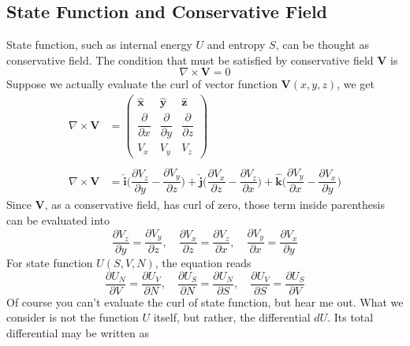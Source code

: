 \documentclass[../../../main.tex]{subfiles}
\begin{document}
\subsection{State Function and Conservative Field}
State function, such as internal energy \(U \) and entropy \(S \), can be thought as conservative field. The condition that must be satisfied by conservative field $\mathbf{V}$ is
\begin{equation*}
    \nabla\times \mathbf{V}=0
\end{equation*}
Suppose we actually evaluate the curl of vector function $\mathbf{V}(x,y,z)$, we get
\begin{align*}
    \nabla\times \mathbf{V}&=\begin{pmatrix}
        \mathbf{\hat{x}} & \mathbf{\hat{y}} & \mathbf{\hat{z}}\\
        \dfrac{\partial }{\partial x} & \dfrac{\partial }{\partial y} & \dfrac{\partial }{\partial z}\\
        V_x& V_y & V_z
    \end{pmatrix}\\
    \\
    \nabla\times \mathbf{V}&=
    \mathbf{\hat{i}} \biggl(\dfrac{\partial V_z}{\partial y} -\dfrac{\partial V_y}{\partial z}\biggr)+ 
    \mathbf{\hat{j}} \biggl(\dfrac{\partial V_x}{\partial z}-\dfrac{\partial V_z}{\partial x} \biggr) + 
    \mathbf{\hat{k}}\biggl( \dfrac{\partial V_y}{\partial x}-\dfrac{\partial V_x}{\partial y}\biggr)
\end{align*} 
Since \textbf{V}, as a conservative field, has curl of zero, those term inside parenthesis can be evaluated into
\begin{equation*}
    \dfrac{\partial V_z}{\partial y} =\dfrac{\partial V_y}{\partial z},\quad
    \dfrac{\partial V_x}{\partial z}=\dfrac{\partial V_z}{\partial x},\quad
    \dfrac{\partial V_y}{\partial x}=\dfrac{\partial V_x}{\partial y}
\end{equation*}
For state function \(U(S,V,N)\), the equation reads
\begin{equation*}
    \dfrac{\partial U_N}{\partial V} =\dfrac{\partial U_V}{\partial N},\quad
    \dfrac{\partial U_S}{\partial N}=\dfrac{\partial U_N}{\partial S},\quad
    \dfrac{\partial U_V}{\partial S}=\dfrac{\partial U_S}{\partial V}
\end{equation*}
Of course you can't evaluate the curl of state function, but hear me out. What we consider is not the function $U$ itself, but rather, the differential $dU$. Its total differential may be written as 
\end{document}
